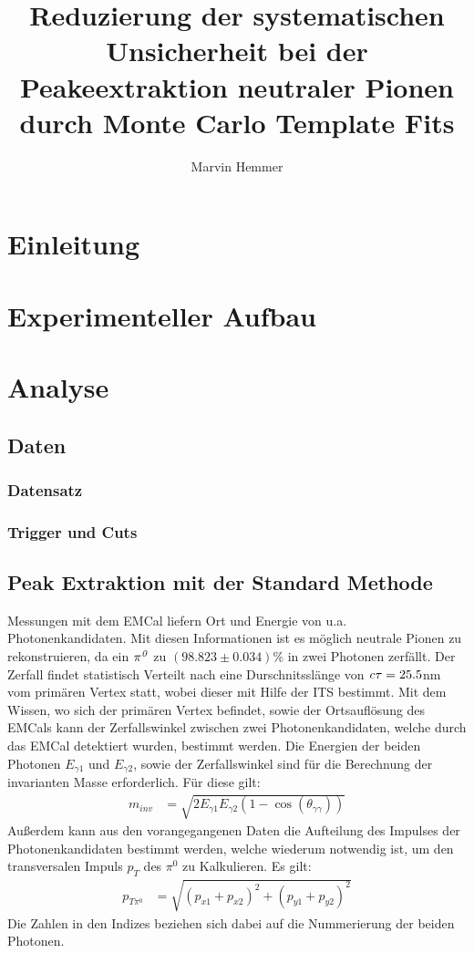 \documentclass[]{article}
\title{Reduzierung der systematischen Unsicherheit bei der Peakeextraktion neutraler Pionen durch Monte Carlo Template Fits}
\author{Marvin Hemmer}
\begin{document}
\maketitle
\newpage
\tableofcontents
\newpage

	\section{Einleitung}

	\section{Experimenteller Aufbau}

	\section{Analyse}
	\subsection{Daten}
	\subsubsection{Datensatz}
	\subsubsection{Trigger und Cuts}
	\subsection{Peak Extraktion mit der Standard Methode}
	Messungen mit dem EMCal liefern Ort und Energie von u.a. Photonenkandidaten. Mit diesen Informationen ist es m{\"o}glich neutrale Pionen zu rekonstruieren, da ein ${\it \pi^{0}}$ zu $\left( 98.823\pm0.034\right)\%$ in zwei Photonen zerf{\"a}llt. Der Zerfall findet statistisch Verteilt nach eine Durschnitssl{\"a}nge von ${\it c\tau} = 25.5$nm vom prim{\"a}ren Vertex statt, wobei dieser mit Hilfe der ITS bestimmt.
	Mit dem Wissen, wo sich der prim{\"a}ren Vertex befindet, sowie der Ortsaufl{\"o}sung des EMCals kann der Zerfallswinkel zwischen zwei Photonenkandidaten, welche durch das EMCal detektiert wurden, bestimmt werden.
	Die Energien der beiden Photonen $E_{\gamma1}$ und $E_{\gamma2}$, sowie der Zerfallswinkel sind f{\"u}r die Berechnung der invarianten Masse erforderlich. F{\"u}r diese gilt:
	\begin{align}
	\label{eq_invmass}
	m_{inv} &= \sqrt{2E_{\gamma1}E_{\gamma2}(1-\cos\left( \theta_{\gamma\gamma}\right) )} 
	\end{align}
	Au{\ss}erdem kann aus den vorangegangenen Daten die Aufteilung des Impulses der Photonenkandidaten bestimmt werden, welche wiederum notwendig ist, um den transversalen Impuls $p_{T}$ des $\pi^{0}$ zu Kalkulieren.
	Es gilt:
	\begin{align}
	\label{eq_pt}
	p_{T\pi^{0}} &= \sqrt{\left(p_{x1}+p_{x2}\right)^{2} +\left(p_{y1}+p_{y2}\right)^{2}} 
	\end{align}
	Die Zahlen in den Indizes beziehen sich dabei auf die Nummerierung der beiden Photonen.
	
\end{document}

